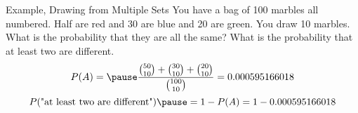 \documentclass[]{beamer}
\newcommand{\nl}[1]{\vspace{#1 em}}
\begin{document}
\begin{frame}{Example, Drawing from Multiple Sets}
    You have a bag of 100 marbles all numbered. Half are red and 30 are blue and 20 are green. You draw 10 marbles. What is the probability that they are all the same? What is the probability that at least two are different.\\
    \nl{0.5}
    \pause 
    \[P(A) = \pause \frac{\binom{50}{10} + \binom{30}{10} + \binom{20}{10}}{\binom{100}{10}} = 0.000595166018\]
    \pause \[P(\text{"at least two are different"}) \pause = 1 - P(A) = 1-0.000595166018\]
\end{frame}
\end{document}
